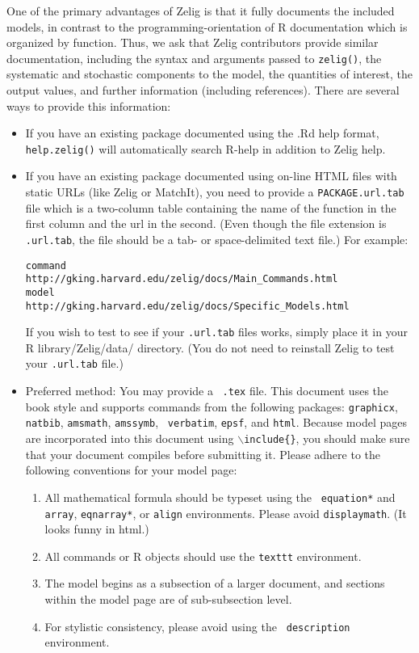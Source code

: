 One of the primary advantages of Zelig is that it fully documents the
included models, in contrast to the programming-orientation of R
documentation which is organized by function.  Thus, we ask that Zelig
contributors provide similar documentation, including the syntax and
arguments passed to {\tt zelig()}, the systematic and stochastic
components to the model, the quantities of interest, the output
values, and further information (including references).  There are
several ways to provide this information:  
\begin{itemize}
\item If you have an existing package documented using the .Rd help
  format, {\tt help.zelig()} will automatically search R-help in
  addition to Zelig help.
\item If you have an existing package documented using on-line HTML
  files with static URLs (like Zelig or MatchIt), you need to provide
  a {\tt PACKAGE.url.tab} file which is a two-column table containing
  the name of the function in the first column and the url in the
  second.  (Even though the file extension is {\tt .url.tab}, the file
  should be a tab- or space-delimited text file.)  For example:  
\begin{verbatim}
command       http://gking.harvard.edu/zelig/docs/Main_Commands.html
model         http://gking.harvard.edu/zelig/docs/Specific_Models.html
\end{verbatim}
If you wish to test to see if your {\tt .url.tab} files works, simply
place it in your R library/Zelig/data/ directory.  (You do not need to
reinstall Zelig to test your {\tt .url.tab} file.)
\item Preferred method:  You may provide a \LaTeXe\ {\tt .tex} file.  This document uses
  the book style and supports commands from the following packages:
  {\tt graphicx}, {\tt natbib}, {\tt amsmath}, {\tt amssymb}, {\tt
    verbatim}, {\tt epsf}, and {\tt html}.  Because model pages are
  incorporated into this document using {\tt $\backslash$include\{\}},
  you should make sure that your document compiles before submitting
  it.  Please adhere to the following conventions for your model page: 
  \begin{enumerate}
  \item All mathematical formula should be typeset using the {\tt
      equation*} and {\tt array}, {\tt eqnarray*}, or {\tt align}
    environments.  Please avoid {\tt displaymath}.  (It looks funny in
    html.)
  \item All commands or R objects should use the {\tt texttt}
    environment.
  \item The model begins as a subsection of a larger document, and
    sections within the model page are of sub-subsection level.
\item For stylistic consistency, please avoid using the {\tt
    description} environment.
\end{enumerate}


\end{itemize}
